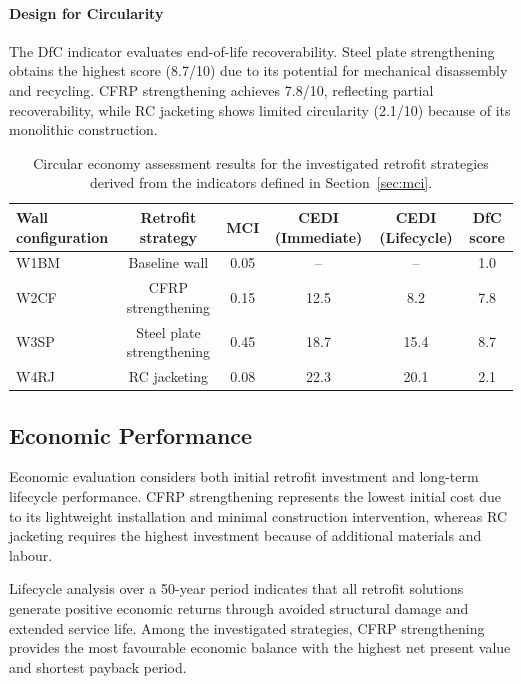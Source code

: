 \documentclass[fleqn,10pt]{wlscirep}
\begin{document}
\paragraph{Design for Circularity}

The DfC indicator evaluates end-of-life recoverability. Steel plate
strengthening obtains the highest score (8.7/10) due to its potential for
mechanical disassembly and recycling. CFRP strengthening achieves
7.8/10, reflecting partial recoverability, while RC jacketing shows
limited circularity (2.1/10) because of its monolithic construction.

\begin{table}[h]
\centering
\caption{Circular economy assessment results for the investigated retrofit strategies derived from the indicators defined in Section~\ref{sec:mci}.}
\label{tab:CE_metrics}
\begin{tabular}{lccccc}
\hline
\textbf{Wall configuration} & \textbf{Retrofit strategy} & \textbf{MCI} & \textbf{CEDI (Immediate)} & \textbf{CEDI (Lifecycle)} & \textbf{DfC score} \\
\hline
W1BM & Baseline wall & 0.05 & -- & -- & 1.0 \\
W2CF & CFRP strengthening & 0.15 & 12.5 & 8.2 & 7.8 \\
W3SP & Steel plate strengthening & 0.45 & 18.7 & 15.4 & 8.7 \\
W4RJ & RC jacketing & 0.08 & 22.3 & 20.1 & 2.1 \\
\hline
\end{tabular}
\end{table}

\subsection{Economic Performance}

Economic evaluation considers both initial retrofit investment and
long-term lifecycle performance. CFRP strengthening represents the
lowest initial cost due to its lightweight installation and minimal
construction intervention, whereas RC jacketing requires the highest
investment because of additional materials and labour.

Lifecycle analysis over a 50-year period indicates that all retrofit
solutions generate positive economic returns through avoided structural
damage and extended service life. Among the investigated strategies,
CFRP strengthening provides the most favourable economic balance with
the highest net present value and shortest payback period.
\end{document}
